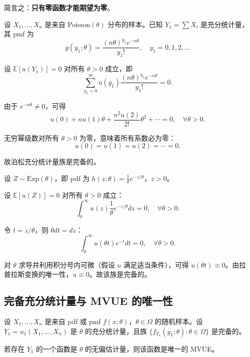 简言之：\textbf{只有零函数才能期望为零}。

\begin{example}[泊松分布族的完备性]\label{ex:poisson-complete}
设 $X_1, \ldots, X_n$ 是来自 Poisson$(\theta)$ 分布的样本。已知 $Y_1 = \sum X_i$ 是充分统计量，其 pmf 为
\[
g(y_1; \theta) = \frac{(n\theta)^{y_1} e^{-n\theta}}{y_1!},\quad y_1 = 0,1,2,\ldots
\]

设 $\mathbb{E}[u(Y_1)] = 0$ 对所有 $\theta > 0$ 成立，即
\[
\sum_{y_1=0}^\infty u(y_1) \frac{(n\theta)^{y_1} e^{-n\theta}}{y_1!} = 0.
\]

由于 $e^{-n\theta} \neq 0$，可得
\[
u(0) + n u(1) \theta + \frac{n^2 u(2)}{2!} \theta^2 + \cdots = 0,\quad \forall \theta > 0.
\]

无穷幂级数对所有 $\theta > 0$ 为零，意味着所有系数必为零：
\[
u(0) = u(1) = u(2) = \cdots = 0.
\]

故泊松充分统计量族是完备的。
\end{example}

\begin{example}[指数分布族的完备性]\label{ex:exponential-complete}
设 $Z \sim \text{Exp}(\theta)$，即 pdf 为 $h(z; \theta) = \frac{1}{\theta} e^{-z/\theta}$，$z > 0$。

设 $\mathbb{E}[u(Z)] = 0$ 对所有 $\theta > 0$ 成立：
\[
\int_0^\infty u(z) \frac{1}{\theta} e^{-z/\theta} dz = 0,\quad \forall \theta > 0.
\]

令 $t = z/\theta$，则 $\theta dt = dz$：
\[
\int_0^\infty u(\theta t) e^{-t} dt = 0,\quad \forall \theta > 0.
\]

对 $\theta$ 求导并利用积分号内可微（假设 $u$ 满足适当条件），可得 $u(\theta t) \equiv 0$。由拉普拉斯变换的唯一性，$u \equiv 0$。故该族是完备的。
\end{example}

\subsection{完备充分统计量与 MVUE 的唯一性}

\begin{theorem}\label{th:lehmann-scheffe}
设 $X_1, \ldots, X_n$ 是来自 pdf 或 pmf $f(x; \theta)$，$\theta \in \Omega$ 的随机样本。设 $Y_1 = u_1(X_1, \ldots, X_n)$ 是 $\theta$ 的充分统计量，且族 $\{f_{Y_1}(y_1; \theta): \theta \in \Omega\}$ 是完备的。

若存在 $Y_1$ 的一个函数是 $\theta$ 的无偏估计量，则该函数是唯一的 MVUE。
\end{theorem}

